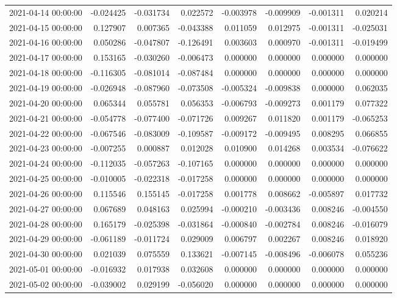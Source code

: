 \begin{tabular}{lrrrrrrr}
2021-04-14 00:00:00 & -0.024425 & -0.031734 & 0.022572 & -0.003978 & -0.009909 & -0.001311 & 0.020214 \\
2021-04-15 00:00:00 & 0.127907 & 0.007365 & -0.043388 & 0.011059 & 0.012975 & -0.001311 & -0.025031 \\
2021-04-16 00:00:00 & 0.050286 & -0.047807 & -0.126491 & 0.003603 & 0.000970 & -0.001311 & -0.019499 \\
2021-04-17 00:00:00 & 0.153165 & -0.030260 & -0.006473 & 0.000000 & 0.000000 & 0.000000 & 0.000000 \\
2021-04-18 00:00:00 & -0.116305 & -0.081014 & -0.087484 & 0.000000 & 0.000000 & 0.000000 & 0.000000 \\
2021-04-19 00:00:00 & -0.026948 & -0.087960 & -0.073508 & -0.005324 & -0.009838 & 0.000000 & 0.062035 \\
2021-04-20 00:00:00 & 0.065344 & 0.055781 & 0.056353 & -0.006793 & -0.009273 & 0.001179 & 0.077322 \\
2021-04-21 00:00:00 & -0.054778 & -0.077400 & -0.071726 & 0.009267 & 0.011820 & 0.001179 & -0.065253 \\
2021-04-22 00:00:00 & -0.067546 & -0.083009 & -0.109587 & -0.009172 & -0.009495 & 0.008295 & 0.066855 \\
2021-04-23 00:00:00 & -0.007255 & 0.000887 & 0.012028 & 0.010900 & 0.014268 & 0.003534 & -0.076622 \\
2021-04-24 00:00:00 & -0.112035 & -0.057263 & -0.107165 & 0.000000 & 0.000000 & 0.000000 & 0.000000 \\
2021-04-25 00:00:00 & -0.010005 & -0.022318 & -0.017258 & 0.000000 & 0.000000 & 0.000000 & 0.000000 \\
2021-04-26 00:00:00 & 0.115546 & 0.155145 & -0.017258 & 0.001778 & 0.008662 & -0.005897 & 0.017732 \\
2021-04-27 00:00:00 & 0.067689 & 0.048163 & 0.025994 & -0.000210 & -0.003436 & 0.008246 & -0.004550 \\
2021-04-28 00:00:00 & 0.165179 & -0.025398 & -0.031864 & -0.000840 & -0.002784 & 0.008246 & -0.016079 \\
2021-04-29 00:00:00 & -0.061189 & -0.011724 & 0.029009 & 0.006797 & 0.002267 & 0.008246 & 0.018920 \\
2021-04-30 00:00:00 & 0.021039 & 0.075559 & 0.133621 & -0.007145 & -0.008496 & -0.006078 & 0.055236 \\
2021-05-01 00:00:00 & -0.016932 & 0.017938 & 0.032608 & 0.000000 & 0.000000 & 0.000000 & 0.000000 \\
2021-05-02 00:00:00 & -0.039002 & 0.029199 & -0.056020 & 0.000000 & 0.000000 & 0.000000 & 0.000000 \\

\end{tabular}
